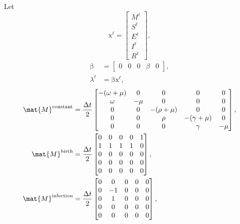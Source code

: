 \documentclass{jpmarticle}
\renewcommand{\vec}[1]{\boldsymbol{\mathrm{#1}}}
\begin{document}
Let
\begin{equation}
  \vec{x}^{\ell} =
  \begin{bmatrix}
    M^{\ell} \\ S^{\ell} \\ E^{\ell} \\ I^{\ell} \\ R^{\ell}
  \end{bmatrix},
\end{equation}
\begin{equation}
  \begin{split}
    \vec{\beta} &=
    \begin{bmatrix}
      0 & 0 & 0 & \beta & 0
    \end{bmatrix},
    \\
    \lambda^{\ell} &=
    \vec{\beta} \vec{x}^{\ell},
  \end{split}
\end{equation}
\begin{equation}
  \begin{split}
    \mat{M}^{\text{constant}} &=
    \frac{\Delta t}{2}
    \begin{bmatrix}
      - (\omega + \mu) & 0 & 0 & 0 & 0
      \\
      \omega & - \mu & 0 & 0 & 0
      \\
      0 & 0 & - (\rho + \mu) & 0 & 0 \\
      0 & 0 & \rho & - (\gamma + \mu) & 0
      \\
      0 & 0 & 0 & \gamma & - \mu
    \end{bmatrix},
    \\
    \mat{M}^{\text{birth}} &=
    \frac{\Delta t}{2}
    \begin{bmatrix}
      0 & 0 & 0 & 0 & 1
      \\
      1 & 1 & 1 & 1 & 0
      \\
      0 & 0 & 0 & 0 & 0
      \\
      0 & 0 & 0 & 0 & 0
      \\
      0 & 0 & 0 & 0 & 0
    \end{bmatrix},
    \\
    \mat{M}^{\text{infection}} &=
    \frac{\Delta t}{2}
    \begin{bmatrix}
      0 & 0 & 0 & 0 & 0
      \\
      0 & - 1 & 0 & 0 & 0
      \\
      0 & 1 & 0 & 0 & 0
      \\
      0 & 0 & 0 & 0 & 0
      \\
      0 & 0 & 0 & 0 & 0
    \end{bmatrix},
  \end{split}
\end{equation}
\end{document}
